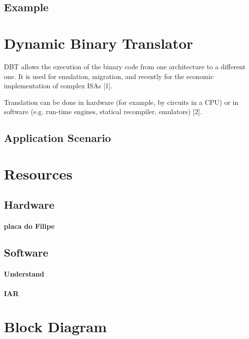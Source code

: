\documentclass{report}
\begin{document}
		\subsection{Example}

	\section{Dynamic Binary Translator}
	
		\par DBT allows the execution of the binary code from one architecture to a different one. It is used for emulation, migration, and recently for the economic implementation of complex ISAs [1].
		
		Translation can be done in hardware (for example, by circuits in a CPU) or in software (e.g. run-time engines, statical recompiler, emulators) [2].
		

		\subsection{Application Scenario}

	\section{Resources}

		\subsection{Hardware}

			\paragraph{placa do Filipe}

		\subsection{Software}

			\paragraph{Understand}

			\paragraph{IAR}

	\section{Block Diagram}
\end{document}
